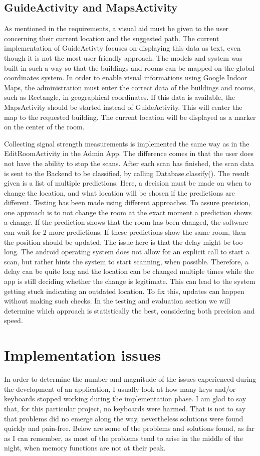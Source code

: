 \subsection{GuideActivity and MapsActivity}
As mentioned in the requirements, a visual aid must be given to the user concerning their current location and the suggested path. The current implementation of GuideActivty focuses on displaying this data as text, even though it is not the most user friendly approach. The models and system was built in such a way so that the buildings and rooms can be mapped on the global coordinates system. In order to enable visual informations using Google Indoor Maps, the administration must enter the correct data of the buildings and rooms, such as Rectangle, in geographical coordinates. If this data is available, the MapsActivity should be started instead of GuideActivity. This will center the map to the requested building. The current location will be displayed as a marker on the center of the room.

\noindent
Collecting signal strength measurements is implemented the same way as in the EditRoomActivity in the Admin App. The difference comes in that the user does not have the ability to stop the scans. After each scan has finished, the scan data is sent to the Backend to be classified, by calling Database.classify(). The result given is a list of multiple predictions. Here, a decision must be made on when to change the location, and what location will be chosen if the predictions are different. Testing has been made using different approaches. To assure precision, one approach is to not change the room at the exact moment a prediction shows a change. If the prediction shows that the room has been changed, the software can wait for 2 more predictions. If these predictions show the same room, then the position should be updated. The issue here is that the delay might be too long. The android operating system does not allow for an explicit call to start a scan, but rather hints the system to start scanning, when possible. Therefore, a delay can be quite long and the location can be changed multiple times while the app is still deciding whether the change is legitimate. This can lead to the system getting stuck indicating an outdated location. To fix this, updates can happen without making such checks. In the testing and evaluation section we will determine which approach is statistically the best, considering both precision and speed.
\section{Implementation issues}
In order to determine the number and magnitude of the issues experienced during the development of an application, I usually look at how many keys and/or keyboards stopped working during the implementation phase. I am glad to say that, for this particular project, no keyboards were harmed. That is not to say that problems did no emerge along the way, nevertheless solutions were found quickly and pain-free. Below are some of the problems and solutions found, as far as I can remember, as most of the problems tend to arise in the middle of the night, when memory functions are not at their peak.

